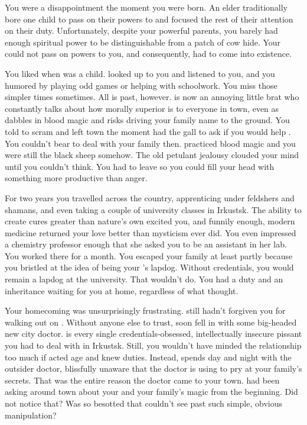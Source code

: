 \documentclass[char]{Pestilence}
\begin{document}
\name{\cApprentice{}}

You were a disappointment the moment you were born. An elder traditionally bore one child to pass on their powers to and focused the rest of their attention on their duty. Unfortunately, despite your powerful parents, you barely had enough spiritual power to be distinguishable from a patch of cow hide. Your \cElder{\parent} could not pass on \cElder{\their} powers to you, and consequently, \cRebel{} had to come into existence.

You liked \cRebel{} when \cRebel{\they} was a child. \cRebel{\They} looked up to you and listened to you, and you humored \cRebel{\them} by playing \cRebel{\their} odd games or helping with \cRebel{\their} schoolwork. You miss those simpler times sometimes. All is past, however. \cRebel{} is now an annoying little brat who constantly talks about how morally superior \cRebel{\they} is to everyone in town, even as \cRebel{\they} dabbles in blood magic and risks driving your family name to the ground. You told \cRebel{\them} to scram and left town the moment \cRebel{\they} had the gall to ask if you would help \cRebel{\them}. You couldn't bear to deal with your family then. \cRebel{} practiced blood magic and you were still the black sheep somehow. The old petulant jealousy clouded your mind until you couldn't think. You had to leave so you could fill your head with something more productive than anger.

For two years you travelled across the country, apprenticing under feldshers and shamans, and even taking a couple of university classes in Irkustsk. The ability to create cures greater than nature's own excited you, and funnily enough, modern medicine returned your love better than mysticism ever did. You even impressed a chemistry professor enough that she asked you to be an assistant in her lab. You worked there for a month. You escaped your family at least partly because you bristled at the idea of being your \cRebel{\sibling}'s lapdog. Without credentials, you would remain a lapdog at the university. That wouldn't do. You had a duty and an inheritance waiting for you at home, regardless of what \cElder{\Parent} thought.

Your homecoming was unsurprisingly frustrating. \cRebel{} still hadn't forgiven you for walking out on \cRebel{\them}. Without anyone else to trust, \cRebel{\they} soon fell in with some big-headed new city doctor. \cOutsider{} is every single credentials-obsessed, intellectually insecure pissant you had to deal with in Irkustsk. Still, you wouldn't have minded the relationship too much if \cRebel{} acted \cRebel{\their} age and knew \cRebel{\their} duties. Instead, \cRebel{\they} spends day and night with the outsider doctor, blissfully unaware that the doctor is using \cRebel{\them} to pry at your family's secrets. That was the entire reason the doctor came to your town. \cOutsider{\They} had been asking around town about your \cElder{\parent} and your family's magic from the beginning. Did \cRebel{} not notice that? Was \cRebel{\they} so besotted that \cRebel{\they} couldn't see past such simple, obvious manipulation?
\end{document}
